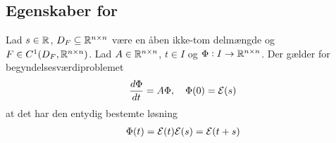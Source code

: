 \subsection[Egenskaber for \texorpdfstring{$e^{tA}$}{exp(tA)}]{Egenskaber for }


\begin{minipage}\textwidth
\begin{thmx} \textbf{} \label{sæt:begyndelsesværdiproblemet_for_phi}%
\newline
Lad $s\in \mathbb{R}$, $D_F \subseteq \mathbb{R}^{n\times n}$ være en åben ikke-tom delmængde og $F \in C^1(D_F,\mathbb{R}^{n\times n})$. Lad $A \in \mathbb{R}^{n \times n}$, $t\in I$ og $\Phi: I \to \mathbb{R}^{n \times n}$. Der gælder for begyndelsesværdiproblemet
\begin{align}\label{eq:begyndelsesværdiproblemet_for_phi}
    \frac{d\Phi}{dt}= A\Phi, \quad \Phi(0) = \mathcal{E}(s)
\end{align}
at det har den entydig bestemte løsning
\begin{align}
    \Phi(t) = \mathcal{E}(t)\mathcal{E}(s) = \mathcal{E}(t+s)
\end{align}
\end{thmx}
\end{minipage}

